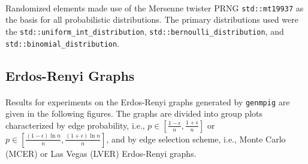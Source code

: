 \documentclass[11pt,epsf]{article}
\begin{document}
{{    \paragraph{}{
      Randomized elements\autocite{random} made use of the Mersenne twister PRNG \texttt{std::mt19937}\autocite{mt19337}
      as the basis for all probabilistic distributions. The primary distributions used were
      the \texttt{std::uniform\_int\_distribution}\autocite{uniformintdist},
      \texttt{std::bernoulli\_distribution}\autocite{bernoullidist}, and
      \texttt{std::binomial\_distribution}\autocite{binomialdist}.
    }
  }

  \subsection{Erdos-Renyi Graphs}{
    \paragraph{}{
      Results for experiments on the Erdos-Renyi graphs generated by \texttt{genmpig}
      are given in the following figures. The graphs are divided into group plots characterized
      by edge probability, i.e., $p \in [\frac{1-\epsilon}{n}, \frac{1+\epsilon}{n}]$ or
      $p \in [\frac{(1-\epsilon)\ln n}{n}, \frac{(1+\epsilon)\ln n}{n}]$, and by
      edge selection scheme, i.e., Monte Carlo (MCER) or Las Vegas (LVER) Erdos-Renyi graphs.
    }
}}
\end{document}
